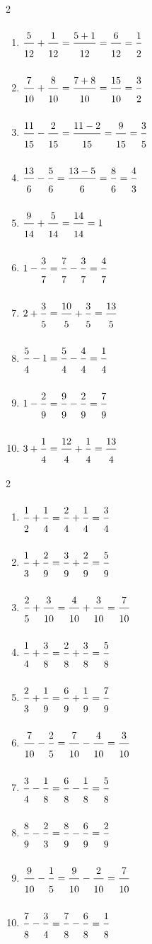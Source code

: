 \ExoC
\begin{multicols}{2}
\begin{enumerate}[leftmargin=*,align=parleft, label=\alph*), itemsep=6pt, topsep=2pt]
\item $\FA{5}{12}+\FA{1}{12}=\FA{5 + 1}{12}=\FA{6}{12}=\FA{1}{2}$
\item $\FA{7}{10}+\FA{8}{10}=\FA{7 + 8}{10}=\FA{15}{10}=\FA{3}{2}$
\item $\FA{11}{15}-\FA{2}{15}=\FA{11 - 2}{15}=\FA{9}{15}=\FA{3}{5}$
\item $\FA{13}{6}-\FA{5}{6}=\FA{13 - 5}{6}=\FA{8}{6}=\FA{4}{3}$
\item $\FA{9}{14}+\FA{5}{14}=\FA{14}{14}=1$
\item $1-\FA{3}{7}=\FA{7}{7}-\FA{3}{7}=\FA{4}{7}$
\item $2+\FA{3}{5}=\FA{10}{5}+\FA{3}{5}=\FA{13}{5}$
\item $\FA{5}{4}-1=\FA{5}{4}-\FA{4}{4}=\FA{1}{4}$
\item $1-\FA{2}{9}=\FA{9}{9}-\FA{2}{9}=\FA{7}{9}$
\item $3+\FA{1}{4}=\FA{12}{4}+\FA{1}{4}=\FA{13}{4}$
\end{enumerate}
\end{multicols}
 
\ExoC
\begin{multicols}{2}
\begin{enumerate}[leftmargin=*,align=parleft, label=\alph*), itemsep=6pt, topsep=2pt]
\item $\FA{1}{2}+\FA{1}{4}=\FA{2}{4}+\FA{1}{4}=\FA{3}{4}$
\item $\FA{1}{3}+\FA{2}{9}=\FA{3}{9}+\FA{2}{9}=\FA{5}{9}$
\item $\FA{2}{5}+\FA{3}{10}=\FA{4}{10}+\FA{3}{10}=\FA{7}{10}$
\item $\FA{1}{4}+\FA{3}{8}=\FA{2}{8}+\FA{3}{8}=\FA{5}{8}$
\item $\FA{2}{3}+\FA{1}{9}=\FA{6}{9}+\FA{1}{9}=\FA{7}{9}$
\item $\FA{7}{10}-\FA{2}{5}=\FA{7}{10}-\FA{4}{10}=\FA{3}{10}$
\item $\FA{3}{4}-\FA{1}{8}=\FA{6}{8}-\FA{1}{8}=\FA{5}{8}$
\item $\FA{8}{9}-\FA{2}{3}=\FA{8}{9}-\FA{6}{9}=\FA{2}{9}$
\item $\FA{9}{10}-\FA{1}{5}=\FA{9}{10}-\FA{2}{10}=\FA{7}{10}$
\item $\FA{7}{8}-\FA{3}{4}=\FA{7}{8}-\FA{6}{8}=\FA{1}{8}$
\end{enumerate}
\end{multicols}
 
